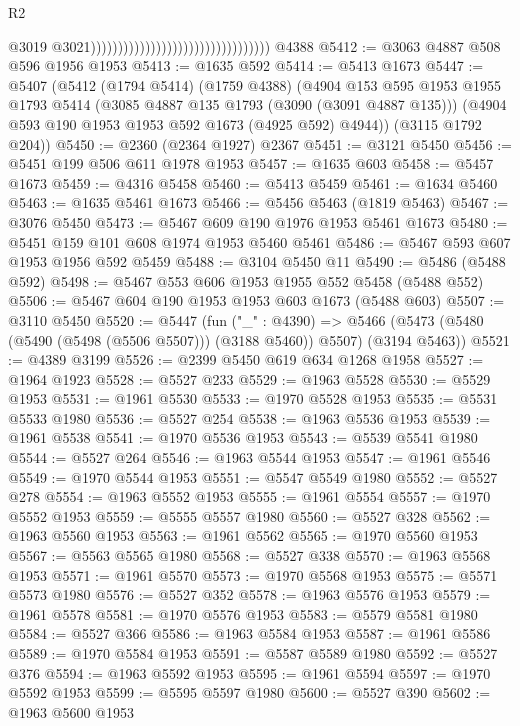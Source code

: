 \begin{lexlean}{R2}
\begin{coremodule}
                                                                      @3019
                                                                      @3021)))))))))))))))))))))))))))))))))
    @4388
@5412 := @3063 @4887 @508 @596 @1956 @1953
@5413 := @1635 @592
@5414 := @5413 @1673
@5447 := @5407
    (@5412
      (@1794 @5414)
      (@1759 @4388)
      (@4904
        @153
        @595
        @1953
        @1955
        @1793
        @5414
        (@3085 @4887 @135 @1793 (@3090 (@3091 @4887 @135)))
        (@4904 @593 @190 @1953 @1953 @592 @1673 (@4925 @592) @4944))
      (@3115 @1792 @204))
@5450 := @2360 (@2364 @1927) @2367
@5451 := @3121 @5450
@5456 := @5451 @199 @506 @611 @1978 @1953
@5457 := @1635 @603
@5458 := @5457 @1673
@5459 := @4316 @5458
@5460 := @5413 @5459
@5461 := @1634 @5460
@5463 := @1635 @5461 @1673
@5466 := @5456 @5463 (@1819 @5463)
@5467 := @3076 @5450
@5473 := @5467 @609 @190 @1976 @1953 @5461 @1673
@5480 := @5451 @159 @101 @608 @1974 @1953 @5460 @5461
@5486 := @5467 @593 @607 @1953 @1956 @592 @5459
@5488 := @3104 @5450 @11
@5490 := @5486 (@5488 @592)
@5498 := @5467 @553 @606 @1953 @1955 @552 @5458 (@5488 @552)
@5506 := @5467 @604 @190 @1953 @1953 @603 @1673 (@5488 @603)
@5507 := @3110 @5450
@5520 := @5447
    (fun ("_" : @4390) =>
    @5466 (@5473 (@5480 (@5490 (@5498 (@5506 @5507))) (@3188 @5460)) @5507) (@3194 @5463))
@5521 := @4389 @3199
@5526 := @2399 @5450 @619 @634 @1268 @1958
@5527 := @1964 @1923
@5528 := @5527 @233
@5529 := @1963 @5528
@5530 := @5529 @1953
@5531 := @1961 @5530
@5533 := @1970 @5528 @1953
@5535 := @5531 @5533 @1980
@5536 := @5527 @254
@5538 := @1963 @5536 @1953
@5539 := @1961 @5538
@5541 := @1970 @5536 @1953
@5543 := @5539 @5541 @1980
@5544 := @5527 @264
@5546 := @1963 @5544 @1953
@5547 := @1961 @5546
@5549 := @1970 @5544 @1953
@5551 := @5547 @5549 @1980
@5552 := @5527 @278
@5554 := @1963 @5552 @1953
@5555 := @1961 @5554
@5557 := @1970 @5552 @1953
@5559 := @5555 @5557 @1980
@5560 := @5527 @328
@5562 := @1963 @5560 @1953
@5563 := @1961 @5562
@5565 := @1970 @5560 @1953
@5567 := @5563 @5565 @1980
@5568 := @5527 @338
@5570 := @1963 @5568 @1953
@5571 := @1961 @5570
@5573 := @1970 @5568 @1953
@5575 := @5571 @5573 @1980
@5576 := @5527 @352
@5578 := @1963 @5576 @1953
@5579 := @1961 @5578
@5581 := @1970 @5576 @1953
@5583 := @5579 @5581 @1980
@5584 := @5527 @366
@5586 := @1963 @5584 @1953
@5587 := @1961 @5586
@5589 := @1970 @5584 @1953
@5591 := @5587 @5589 @1980
@5592 := @5527 @376
@5594 := @1963 @5592 @1953
@5595 := @1961 @5594
@5597 := @1970 @5592 @1953
@5599 := @5595 @5597 @1980
@5600 := @5527 @390
@5602 := @1963 @5600 @1953

\end{coremodule}
\end{lexlean}
